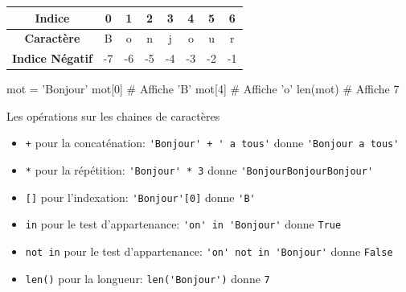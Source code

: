 \begin{propriete}{}
    
    \begin{minipage}{0.5\linewidth}
\begin{center}
        \begin{tabular}{|c|c|c|c|c|c|c|c|}
        \hline
        \textbf{Indice} & 0 & 1 & 2 & 3 & 4 & 5 & 6 \\
        \hline
        \textbf{Caractère} & B & o & n & j & o & u & r \\
        \hline
        \textbf{Indice Négatif} & -7 & -6 & -5 & -4 & -3 & -2 & -1 \\
        \hline
        \end{tabular}
    \end{center}    
    \end{minipage}\hfill{}
    \begin{minipage}{0.5\linewidth}
	\begin{CodePythontexAlt}[TaillePolice=\normalsize, Largeur=1\linewidth,Centre,PremLigne=1, Lignes=false,]{}
            mot = 'Bonjour'
            mot[0]   # Affiche 'B'
            mot[4]   # Affiche 'o'
            len(mot) # Affiche 7
        \end{CodePythontexAlt}
    \end{minipage}
    
\begin{easybox}{Les opérations sur les chaines de caractères}{}   
    \smallskip
    \begin{itemize}
        \item[] \texttt{+} \quad pour la concaténation:  \verb~'Bonjour' + ' a tous'~ donne \verb~'Bonjour a tous'~
        \item[] \texttt{*} \quad pour la répétition:  \verb~'Bonjour' * 3~ donne \verb~'BonjourBonjourBonjour'~
        \item[] \texttt{[]} \quad pour l'indexation:  \verb~'Bonjour'[0]~ donne \verb~'B'~
        \item[] \texttt{in} \quad pour le test d'appartenance:  \verb~'on' in 'Bonjour'~ donne \verb~True~
        \item[] \texttt{not in} \quad pour le test d'appartenance:  \verb~'on' not in 'Bonjour'~ donne \verb~False~
        \item[] \texttt{len()} \quad pour la longueur:  \verb~len('Bonjour')~ donne \verb~7~
       
    \end{itemize}
\end{easybox}


   \end{propriete}

